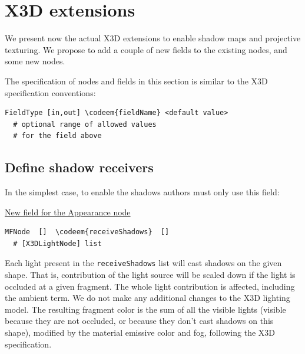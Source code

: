 \documentclass{acmsiggraph}                     %
\newenvironment{mycode}
{\begin{mycodecore}}
{\end{mycodecore}
\vspace{-0.1in}}
\newcommand*{\codeem}[1]{\textbf{#1}}
\begin{document}
\section{X3D extensions}

We present now the actual X3D extensions to enable shadow maps
and projective texturing. We propose to add a couple of new fields
to the existing nodes, and some new nodes.

\needspace{1in}
The specification of nodes and fields in this section is similar to the
X3D specification conventions:

\begin{Verbatim}[commandchars=\\\{\},frame=single]
FieldType [in,out] \codeem{fieldName} <default value>
  # optional range of allowed values
  # for the field above
\end{Verbatim}

\subsection{Define shadow receivers}
\label{sec_receive_shadows}

In the simplest case, to enable the shadows authors must only
use this field:

\begin{mycode}
\underline{New field for the Appearance node}
\begin{Verbatim}[commandchars=\\\{\}]
MFNode  []  \codeem{receiveShadows}  []
  # [X3DLightNode] list
\end{Verbatim}
\end{mycode}

Each light present in the \texttt{receiveShadows} list will cast shadows on
the given shape. That is, contribution of the light source
will be scaled down if the light is occluded at a given fragment.
The whole light contribution is affected, including the ambient term.
We do not make any additional changes to the X3D lighting model.
The resulting fragment color is the sum of all the visible lights (visible
because they are not occluded, or because they don't cast shadows on this shape),
modified by the material emissive color and fog, following the X3D specification.
\end{document}
